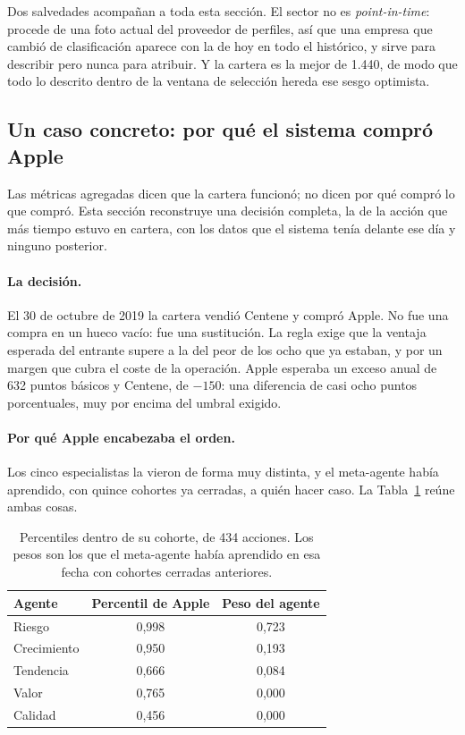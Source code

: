 Dos salvedades acompañan a toda esta sección. El sector no es \textit{point-in-time}:
procede de una foto actual del proveedor de perfiles, así que una empresa que cambió de
clasificación aparece con la de hoy en todo el histórico, y sirve para describir pero nunca para
atribuir. Y la cartera es la mejor de 1.440, de modo que todo lo descrito dentro de la
ventana de selección hereda ese sesgo optimista.


\subsection{Un caso concreto: por qué el sistema compró Apple}
\label{sec:caso-apple}

Las métricas agregadas dicen que la cartera funcionó; no dicen por qué compró lo que compró. Esta
sección reconstruye una decisión completa, la de la acción que más tiempo estuvo en cartera, con los
datos que el sistema tenía delante ese día y ninguno posterior.

\paragraph{La decisión.} El 30 de octubre de 2019 la cartera vendió Centene y compró Apple. No fue
una compra en un hueco vacío: fue una sustitución. La regla exige que la ventaja esperada
del entrante supere a la del peor de los ocho que ya estaban, y por un margen que cubra el coste de
la operación. Apple esperaba un exceso anual de 632 puntos básicos y Centene, de
$-150$: una diferencia de casi ocho puntos porcentuales, muy por encima del umbral exigido.

\paragraph{Por qué Apple encabezaba el orden.} Los cinco especialistas la vieron de forma muy
distinta, y el meta-agente había aprendido, con quince cohortes ya cerradas, a quién hacer caso. La
Tabla~\ref{tab:caso-apple} reúne ambas cosas.

\begin{table}[htbp]
  \centering
  \small
  \caption{Apple el 30 de octubre de 2019: cómo la vio cada agente y cuánto pesaba cada uno.}
  \label{tab:caso-apple}
  \begin{tabularx}{0.86\textwidth}{Xcc}
    \toprule
    Agente & Percentil de Apple & Peso del agente \\
    \midrule
    Riesgo      & 0,998 & 0,723 \\
    Crecimiento & 0,950 & 0,193 \\
    Tendencia   & 0,666 & 0,084 \\
    Valor       & 0,765 & 0,000 \\
    Calidad     & 0,456 & 0,000 \\
    \bottomrule
  \end{tabularx}
  \caption*{Percentiles dentro de su cohorte, de 434 acciones. Los pesos son los que el meta-agente
  había aprendido en esa fecha con cohortes cerradas anteriores.}
\end{table}

